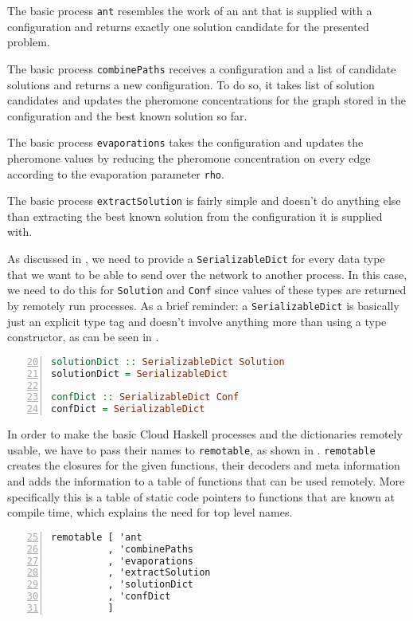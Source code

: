 The basic process \texttt{ant} resembles the work of an ant that is supplied with a configuration and returns exactly one solution candidate for the presented problem.

The basic process \texttt{combinePaths} receives a configuration and a list of candidate solutions and returns a new configuration. To do so, it takes list of solution candidates and updates the pheromone concentrations for the graph stored in the configuration and the best known solution so far.

The basic process \texttt{evaporations} takes the configuration and updates the pheromone values by reducing the pheromone concentration on every edge according to the evaporation parameter \texttt{rho}.

The basic process \texttt{extractSolution} is fairly simple and doesn't do anything else than extracting the best known solution from the configuration it is supplied with.

As discussed in , we need to provide a \texttt{SerializableDict} for every data type that we want to be able to send over the network to another process. In this case, we need to do this for \texttt{Solution} and \texttt{Conf} since values of these types are returned by remotely run processes. As a brief reminder: a \texttt{SerializableDict} is basically just an explicit type tag and doesn't involve anything more than using a type constructor, as can be seen in .

\begin{lstlisting}[language=Haskell,frame=tb,numbers=left,firstnumber=20,label=lst:ant_dicts,caption=Dictionaries for serialisation.]
solutionDict :: SerializableDict Solution
solutionDict = SerializableDict

confDict :: SerializableDict Conf
confDict = SerializableDict
\end{lstlisting}

In order to make the basic \textsf{Cloud Haskell} processes and the dictionaries remotely usable, we have to pass their names to \texttt{remotable}, as shown in . \texttt{remotable} creates the closures for the given functions, their decoders and meta information and adds the information to a table of functions that can be used remotely. More specifically this is a table of static code pointers to functions that are known at compile time, which explains the need for top level names.

\begin{lstlisting}[language=Haskell,frame=tb,numbers=left,firstnumber=25,label=lst:ant_remotable,caption=Making processes and dictionaries remotable.]
remotable [ 'ant
          , 'combinePaths
          , 'evaporations
          , 'extractSolution
          , 'solutionDict
          , 'confDict
          ]
\end{lstlisting}

